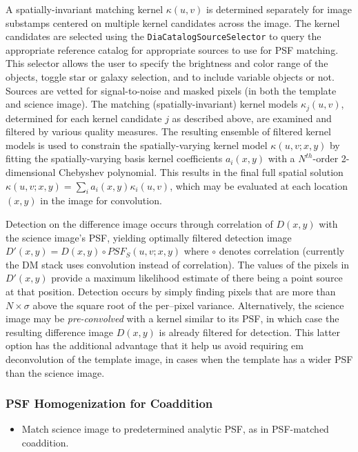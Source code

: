 A spatially-invariant matching kernel $\kappa(u,v)$ is determined separately for image substamps centered on multiple kernel candidates across the image. The kernel candidates are selected using the {\tt   DiaCatalogSourceSelector} to query the appropriate reference catalog for appropriate sources to use for PSF matching. This selector allows the user to specify the brightness and color range of the objects, toggle star or galaxy selection, and to include variable objects or not. Sources are vetted for signal-to-noise and masked pixels (in both the template and science image). The matching (spatially-invariant) kernel models $\kappa_j(u,v)$, determined for each kernel candidate $j$ as described above, are examined and filtered by various quality measures. The resulting ensemble of filtered kernel models is used to constrain the spatially-varying kernel model $\kappa(u,v;x,y)$ by fitting the spatially-varying basis kernel coefficients $a_i(x,y)$ with a $N^{th}$-order 2-dimensional Chebyshev polynomial. This results in the final full spatial solution $\kappa(u,v;x,y) = \sum_i a_i(x,y) \kappa_i(u,v)$, which may be evaluated at each location $(x,y)$ in the image for convolution. 

Detection on the difference image occurs through correlation of $D(x,y)$ with the science image's PSF, yielding optimally filtered detection image $D'(x,y) = D(x,y) \circ PSF_S(u,v;x,y)$ where $\circ$ denotes correlation (currently the DM stack uses convolution instead of correlation). The values of the pixels in $D'(x,y)$ provide a maximum likelihood estimate of there being a point source at that position. Detection occurs by simply finding pixels that are more than $N \times \sigma$ above the square root of the per--pixel variance. Alternatively, the science image may be {\em pre-convolved} with a kernel similar to its PSF, in which case the resulting difference image $D(x,y)$ is already filtered for detection. This latter option has the additional advantage that it help us avoid requiring {em deconvolution} of the template image, in cases when the template has a wider PSF than the science image. 

\subsubsection{PSF Homogenization for Coaddition}
\label{sec:acPSFHomogenization}
\begin{itemize}
\item Match science image to predetermined analytic PSF, as in PSF-matched coaddition.
\end{itemize}

